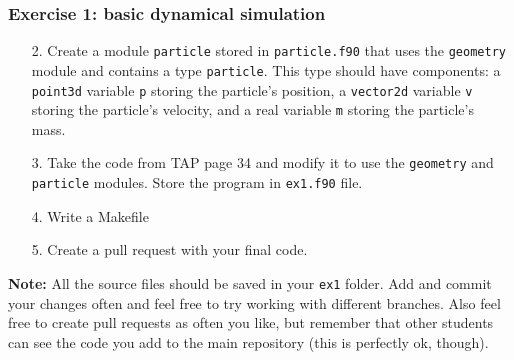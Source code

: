 \begin{frame}
  \frametitle{Exercise 1: basic dynamical simulation}

  \begin{enumerate}
   \item[2.] Create a module \texttt{particle} stored in \texttt{particle.f90} that uses the \texttt{geometry} module and contains a type \texttt{particle}. This type should have components: a \texttt{point3d} variable \texttt{p} storing the particle's position, a \texttt{vector2d} variable \texttt{v} storing the particle's velocity, and a real variable \texttt{m} storing the particle's mass.
   \item[3.] Take the code from TAP page 34 and modify it to use the \texttt{geometry} and \texttt{particle} modules. Store the program in \texttt{ex1.f90} file.
   \item[4.] Write a Makefile
   \item[5.] Create a pull request with your final code.
  \end{enumerate}

  \vspace*{2mm}
  \textbf{Note:} All the source files should be saved in your \texttt{ex1} folder. Add and commit your changes often and feel free to try working with different branches. Also feel free to create pull requests as often you like, but remember that other students can see the code you add to the main repository (this is perfectly ok, though).
  \end{frame}



